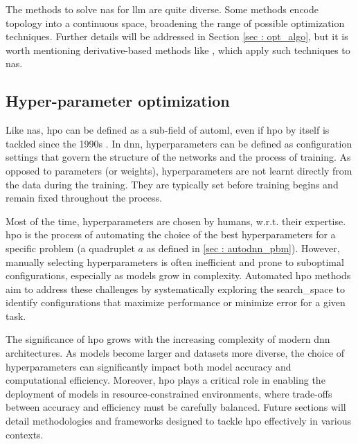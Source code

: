 The methods to solve \acrshort{nas} for \acrshort{llm} are quite diverse. Some methods encode topology into a continuous space, broadening the range of possible optimization techniques. Further details will be addressed in Section \ref{sec : opt_algo}, but it is worth mentioning derivative-based methods like \cite{liu_darts_2019}, which apply such techniques to \acrshort{nas}.

\subsection{Hyper-parameter optimization}
\label{sec : hpo}
Like \acrshort{nas}, \acrshort{hpo} can be defined as a sub-field of \acrshort{automl}, even if \acrshort{hpo} by itself is tackled since the 1990s \cite{feurer_hyperparameter_2019}. In \acrfull{dnn}, \glspl{hyperparameter} can be defined as configuration settings that govern the structure of the networks and the process of training. As opposed to parameters (or weights), \glspl{hyperparameter} are not learnt directly from the data during the training. They are typically set before training begins and remain fixed throughout the process.

Most of the time, \glspl{hyperparameter} are chosen by humans, w.r.t. their expertise. \acrshort{hpo} is the process of automating the choice of the best \glspl{hyperparameter} for a specific problem (a quadruplet $a$ as defined in \ref{sec : autodnn_pbm}). However, manually selecting \glspl{hyperparameter} is often inefficient and prone to suboptimal configurations, especially as models grow in complexity. Automated \acrshort{hpo} methods aim to address these challenges by systematically exploring the \gls{search_space} to identify configurations that maximize performance or minimize error for a given task.

The significance of \acrshort{hpo} grows with the increasing complexity of modern \acrshort{dnn} architectures. As models become larger and datasets more diverse, the choice of \glspl{hyperparameter} can significantly impact both model accuracy and computational efficiency. Moreover, \acrshort{hpo} plays a critical role in enabling the deployment of models in resource-constrained environments, where trade-offs between accuracy and efficiency must be carefully balanced. Future sections will detail methodologies and frameworks designed to tackle \acrshort{hpo} effectively in various contexts.



